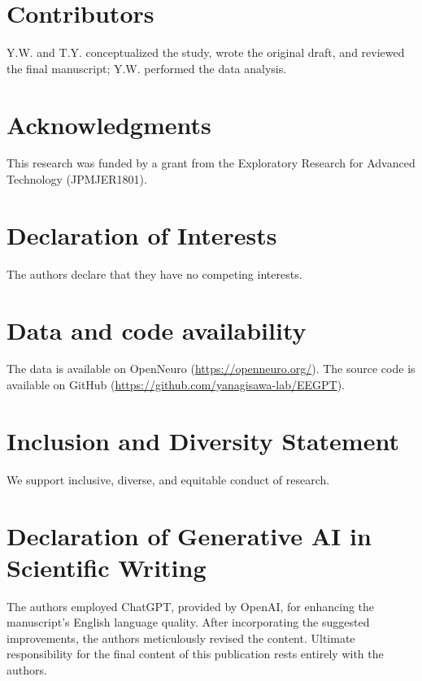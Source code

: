 
\section*{Contributors}
Y.W. and T.Y. conceptualized the study, wrote the original draft, and reviewed the final manuscript; Y.W. performed the data analysis.
\label{contributors}

\section*{Acknowledgments}
This research was funded by a grant from the Exploratory Research for Advanced Technology (JPMJER1801).
\label{acknowledgments}

\section*{Declaration of Interests}
The authors declare that they have no competing interests.
\label{declaration of interests}

\section*{Data and code availability}
The data is available on OpenNeuro (\url{https://openneuro.org/}). The source code is available on GitHub (\url{https://github.com/yanagisawa-lab/EEGPT}).
\label{data and code availability}

\section*{Inclusion and Diversity Statement}
We support inclusive, diverse, and equitable conduct of research.
\label{inclusion and diversity statement}

\section*{Declaration of Generative AI in Scientific Writing}
The authors employed ChatGPT, provided by OpenAI, for enhancing the manuscript's English language quality. After incorporating the suggested improvements, the authors meticulously revised the content. Ultimate responsibility for the final content of this publication rests entirely with the authors.
\label{declaration of generative ai in scientific writing}

